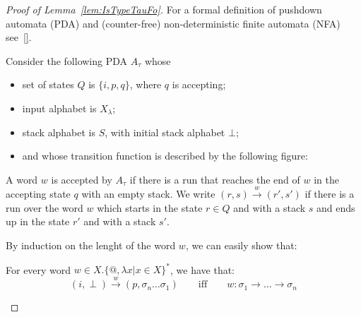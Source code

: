 \begin{proof}[Proof of Lemma~\ref{lem:IsTypeTauFo}]
For a formal definition of pushdown automata (PDA) and (counter-free) non-deterministic finite automata (NFA) see~\ref{}.

Consider the following PDA $A_\tau$ whose
\begin{itemize}
\item set of states $Q$ is $\{i, p, q\}$, where $q$ is accepting;
\item input alphabet is $X_\lambda$;
\item stack alphabet is $S$, with initial stack alphabet $\bot$;
\item and whose transition function is described by the following figure:
\begin{center}

\end{center}
\end{itemize}
A word $w$ is accepted by $A_\tau$ if there is a run that reaches the end of $w$ in the accepting state $q$ with an empty stack. We write $(r, s)\xrightarrow{w} (r', s')$ if there is a run over the word $w$ which starts in the state $r\in Q$ and with a stack $s$ and ends up in the state $r'$ and with a stack $s'$.


By induction on the lenght of the word $w$, we can easily show that:
\begin{lemma}
For every word $w\in X.\{\text{@},\lambda x | x\in X \}^*$, we have that:
 $$(i, \perp)\xrightarrow{w} (p, \sigma_n\dots\sigma_1) \qquad\text{iff} \qquad 
w:\sigma_1\rightarrow\dots\rightarrow\sigma_n$$ 
\end{lemma}


\end{proof}

